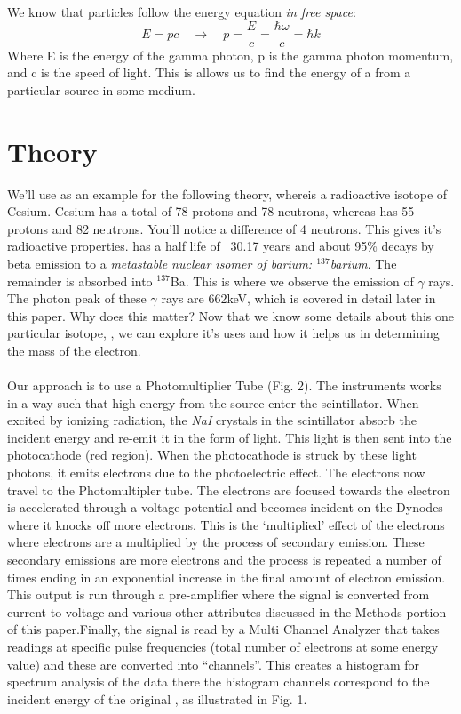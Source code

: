 \documentclass[%
 reprint,
 amsmath,amssymb,
 aps,
]{revtex4-1}
\begin{document}
We know that particles follow the energy equation \textit{in free space}:
\[E = pc \quad \rightarrow \quad p = \frac{E}{c} = \frac{\hbar\omega}{c} = \hbar k \]
 Where E is the energy of the gamma photon, p is the gamma photon momentum, and c is the speed of light. This is allows us to find the energy of a \gp from a particular source in some medium.\\ 
\section{\label{sec:level 1}Theory}
We'll use \cs as an example for the following theory,  where\cs is a radioactive isotope of Cesium. Cesium has a total of 78 protons and 78 neutrons, whereas \cs has 55 protons and 82 neutrons. You'll notice a difference of 4 neutrons. This gives \cs it's radioactive properties. \cs has a half life of ~30.17 years and about 95\% decays by beta emission to a \textit{metastable nuclear isomer of barium: $^{137}$barium}\cite{WCS}. The remainder is absorbed into $^{137}$Ba. This is where we observe the emission of $\gamma$ rays. The photon peak of these $\gamma$ rays are 662keV, which is covered in detail later in this paper. Why does this matter? Now that we know some details about this one particular isotope, \cs, we can explore it's uses and how it helps us in determining the mass of the electron.\\
\\

Our approach is to use a Photomultiplier Tube (Fig. 2). The instruments works in a way such that high energy \gp from the \cs source enter the scintillator. When excited by ionizing radiation, the \textit{NaI} crystals in the scintillator absorb the incident \gp energy and re-emit it in the form of light. This light is then sent into the photocathode (red region). When the photocathode is struck by these light photons, it emits electrons due to the photoelectric effect. The electrons now travel to the Photomultipler tube. The electrons are focused towards the electron is accelerated through a voltage potential and becomes incident on the Dynodes where it knocks off more electrons. This is the `multiplied' effect of the electrons where electrons are a multiplied by the process of secondary emission. These secondary emissions are more electrons and the process is repeated a number of times ending in an exponential increase in the final amount of electron emission. This output is run through a pre-amplifier where the signal is converted from current to voltage and various other attributes discussed in the Methods portion of this paper.Finally, the signal is read by a Multi Channel Analyzer that takes readings at specific pulse frequencies (total number of electrons at some energy value) and these are converted into ``channels''. This creates a histogram for spectrum analysis of the data there the histogram channels correspond to the incident energy of the original \gp, as illustrated in Fig. 1.\\
\end{document}
